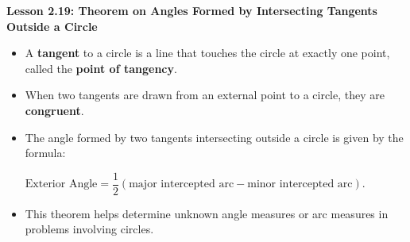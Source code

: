 \begin{center}
\textbf{Lesson 2.19: Theorem on Angles Formed by Intersecting Tangents Outside a Circle}
\end{center}

\vspace*{-1.5ex}

\begin{itemize}
    \item A \textbf{tangent} to a circle is a line that touches the circle at exactly one point, called the \textbf{point of tangency}.
    \item When two tangents are drawn from an external point to a circle, they are \textbf{congruent}.
    \item The angle formed by two tangents intersecting outside a circle is given by the formula:

{\centering $
    \text{Exterior Angle} = \dfrac{1}{2} (\text{major intercepted arc} - \text{minor intercepted arc}).
$\par}
    \item This theorem helps determine unknown angle measures or arc measures in problems involving circles.
\end{itemize}
